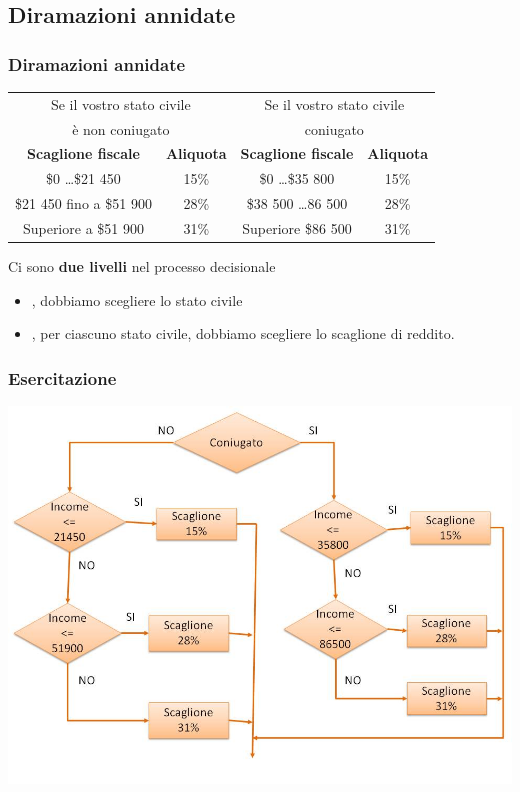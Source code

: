 \subsection*{Diramazioni annidate}
\begin{frame}
\frametitle{Diramazioni annidate}
\begin{table}[t]
\begin{tabular}{c c c c}
\hline
\multicolumn{2}{c}{Se il vostro stato civile} & \multicolumn{2}{c}{Se il vostro stato civile}\\
\multicolumn{2}{c}{è non coniugato} & \multicolumn{2}{c}{coniugato}\\
\hline
\textbf{Scaglione fiscale} & \textbf{Aliquota} & \textbf{Scaglione fiscale} & \textbf{Aliquota}\\
\hline
\$0 \ldots \$21 450 & 15\% & \$0 \ldots \$35 800 & 15\%\\
\hline
\$21 450 fino a \$51 900 & 28\% & \$38 500 \ldots 86 500 & 28\%\\
\hline
Superiore a \$51 900 & 31\% & Superiore \$86 500 & 31\%\\
\hline
\end{tabular}
\end{table}
\begin{block}{}
Ci sono \textbf{\alert{due livelli}} nel processo decisionale
\begin{itemize}
\item \textbf{}, dobbiamo scegliere lo stato civile
\item \textbf{}, per ciascuno stato civile, dobbiamo scegliere lo scaglione di reddito.
\end{itemize}
\end{block}
\end{frame}

\begin{frame}
\frametitle{Esercitazione}
\includegraphics[scale=0.45]{images/eserc1.jpg}
\end{frame}

